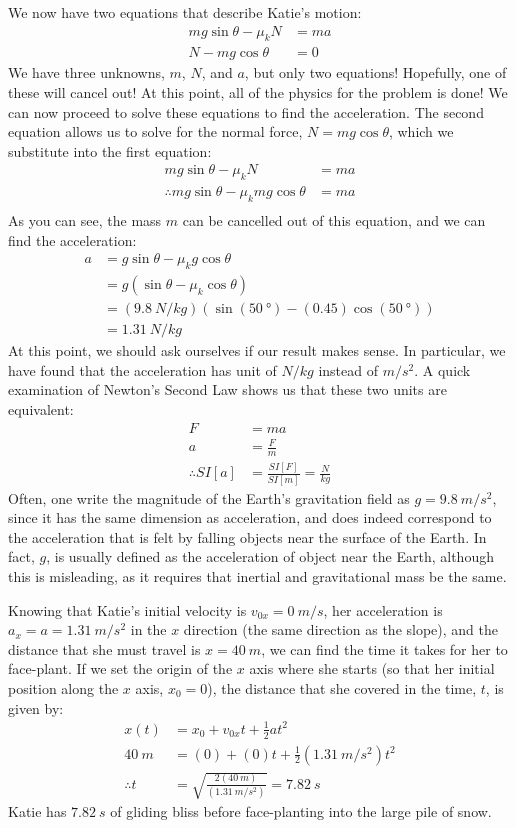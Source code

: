 \begin{problem}
We now have two equations that describe Katie's motion:
\begin{align*}
mg\sin\theta -\mu_k N &= ma\\
N-mg\cos\theta &=0
\end{align*}
We have three unknowns, $m$, $N$, and $a$, but only two equations! Hopefully, one of these will cancel out! At this point, all of the physics for the problem is done! We can now proceed to solve these equations to find the acceleration. The second equation allows us to solve for the normal force, $N=mg\cos\theta$, which we substitute into the first equation:
\begin{align*}
mg\sin\theta -\mu_k N &= ma\\
\therefore mg\sin\theta -\mu_k mg\cos\theta &= ma\\
\end{align*}
As you can see, the mass $m$ can be cancelled out of this equation, and we can find the acceleration:
\begin{align*}
a&=g\sin\theta -\mu_k g\cos\theta\\
&=g(\sin\theta-\mu_k\cos\theta)\\
&=(\SI{9.8}{N/kg})\left(\sin(\SI{50}{\degree})-(0.45)\cos(\SI{50}{\degree})\right)\\
&=\SI{1.31}{N/kg} %
\end{align*}
At this point, we should ask ourselves if our result makes sense. In particular, we have found that the acceleration has unit of $\si{N/kg}$ instead of $\si{m/s^2}$. A quick examination of Newton's Second Law shows us that these two units are equivalent:
\begin{align*}
F &= ma\\
a &= \frac{F}{m}\\
\therefore SI[a] &= \frac{SI[F]}{SI[m]}=\frac{\si{N}}{\si{kg}}
\end{align*}
Often, one write the magnitude of the Earth's gravitation field as $g=\SI{9.8}{m/s^2}$, since it has the same dimension as acceleration, and does indeed correspond to the acceleration that is felt by falling objects near the surface of the Earth. In fact, $g$, is usually defined as the acceleration of object near the Earth, although this is misleading, as it requires that inertial and gravitational mass be the same. 


Knowing that Katie's initial velocity is $v_{0x}=\SI{0}{m/s}$, her acceleration is $a_x=a=\SI{1.31}{m/s^2}$ in the $x$ direction (the same direction as the slope), and the distance that she must travel is $x=\SI{40}{m}$, we can find the time it takes for her to face-plant. If we set the origin of the $x$ axis where she starts (so that her initial position along the $x$ axis, $x_0=0$), the distance that she covered in the time, $t$, is given by:
\begin{align*}
x(t)&=x_0+v_{0x}t+\frac{1}{2}at^2\\
\SI{40}{m}&=(0)+(0)t+\frac{1}{2}(\SI{1.31}{m/s^2})t^2\\
\therefore t&=\sqrt{\frac{2(\SI{40}{m})}{(\SI{1.31}{m/s^2})}}=\SI{7.82}{s}
\end{align*}
Katie has $\SI{7.82}{s}$ of gliding bliss before face-planting into the large pile of snow.
\end{problem}